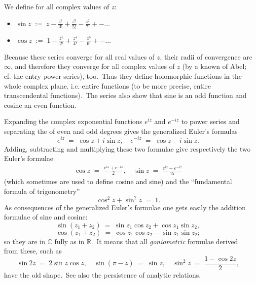 \documentclass[12pt]{article}
\begin{document}
We define for all complex values of $z$:
\begin{itemize}
\item $\displaystyle\sin{z} \;:=\; z\!-\!\frac{z^3}{3!}\!+\!\frac{z^5}{5!}\!-\!\frac{z^7}{7!}\!+-\ldots$
\item $\displaystyle\cos{z} \;:=\; 1\!-\!\frac{z^2}{2!}\!+\!\frac{z^4}{4!}\!-\!\frac{z^6}{6!}\!+-\ldots$
\end{itemize}
Because these series converge for all real values of $z$, their radii of convergence are $\infty$, and therefore they converge for all complex values of $z$ (by a known  of Abel; cf. the entry power series), too.\, Thus they define holomorphic functions in the whole complex plane, i.e. entire functions (to be more precise, entire transcendental functions).\, The series also show that sine is an odd function and cosine an even function.

Expanding the complex exponential functions $e^{iz}$ and $e^{-iz}$ to power series and separating the  of even and odd degrees gives the generalized Euler's formulas
     $$e^{iz} \;=\; \cos{z}+i\sin{z},\quad e^{-iz} \;=\; \cos{z}-i\sin{z}.$$
Adding, subtracting and multiplying these two formulae give respectively the two Euler's formulae
\begin{align}
\cos{z} \;=\; \frac{e^{iz}\!+\!e^{-iz}}{2}, \quad\sin{z} \;=\; \frac{e^{iz}\!-\!e^{-iz}}{2i}
\end{align}
(which sometimes are used to define cosine and sine) and the ``fundamental formula of trigonometry''
                $$\cos^2{z}+\sin^2{z} \;=\; 1.$$
As consequences of the generalized Euler's formulae one gets easily the addition formulae of sine and cosine:
$$\sin{(z_1\!+\!z_2)} \;=\; \sin{z_1}\cos{z_2}+\cos{z_1}\sin{z_2},$$
$$\cos{(z_1\!+\!z_2)} \;=\; \cos{z_1}\cos{z_2}-\sin{z_1}\sin{z_2};$$
so they are in $\mathbb{C}$ fully  as in $\mathbb{R}$.\, It means that all {\em goniometric} formulae derived from these, such as
$$\sin{2z} \;=\; 2\sin{z}\cos{z}, \quad \sin{(\pi\!-\!z)} \;=\; \sin{z}, \quad
 \sin^2{z} \;=\; \frac{1-\cos{2z}}{2},$$
have the old shape.\, See also the persistence of analytic relations.
\end{document}
